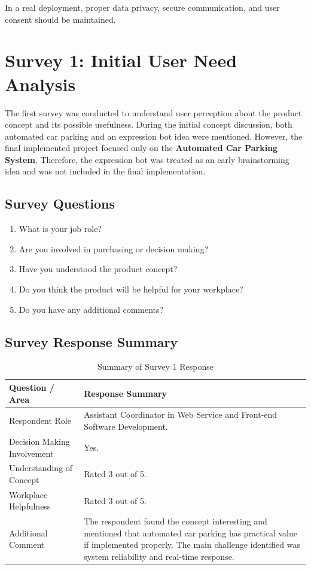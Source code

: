 In a real deployment, proper data privacy, secure communication, and user consent should be maintained.

\section{Survey 1: Initial User Need Analysis}

The first survey was conducted to understand user perception about the product concept and its possible usefulness. During the initial concept discussion, both automated car parking and an expression bot idea were mentioned. However, the final implemented project focused only on the \textbf{Automated Car Parking System}. Therefore, the expression bot was treated as an early brainstorming idea and was not included in the final implementation.

\subsection*{Survey Questions}

\begin{enumerate}
    \item What is your job role?
    \item Are you involved in purchasing or decision making?
    \item Have you understood the product concept?
    \item Do you think the product will be helpful for your workplace?
    \item Do you have any additional comments?
\end{enumerate}

\subsection*{Survey Response Summary}

\begin{table}[H]
\centering
\small
\renewcommand{\arraystretch}{1.15}
\caption{Summary of Survey 1 Response}
\label{tab:survey1_summary}
\begin{tabular}{|p{5cm}|p{8cm}|}
\hline
\textbf{Question / Area} & \textbf{Response Summary} \\
\hline
Respondent Role & Assistant Coordinator in Web Service and Front-end Software Development. \\
\hline
Decision Making Involvement & Yes. \\
\hline
Understanding of Concept & Rated 3 out of 5. \\
\hline
Workplace Helpfulness & Rated 3 out of 5. \\
\hline
Additional Comment & The respondent found the concept interesting and mentioned that automated car parking has practical value if implemented properly. The main challenge identified was system reliability and real-time response. \\
\hline
\end{tabular}
\normalsize
\end{table}

